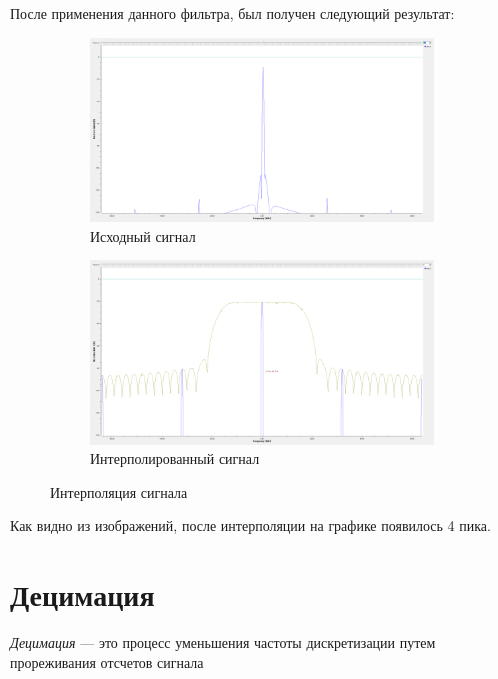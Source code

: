 \documentclass[12pt]{article}
\begin{document}
После применения данного фильтра, был получен следующий результат:
\begin{figure}[H]
    \centering
    \begin{subfigure}[t]{0.48\textwidth}
        \centering
        \includegraphics[width=\textwidth]{images/source-signal.png}
        \caption{Исходный сигнал}
    \end{subfigure}
    \hfill
    \begin{subfigure}[t]{0.48\textwidth}
        \centering
        \includegraphics[width=\textwidth]{images/freq-responce.png}
        \caption{Интерполированный сигнал}
    \end{subfigure}
    \caption{Интерполяция сигнала}
\end{figure}

Как видно из изображений, после интерполяции на графике появилось 4 пика.

\section{Децимация}
\textit{Децимация} --- это процесс уменьшения частоты дискретизации путем прореживания отсчетов сигнала
\end{document}
